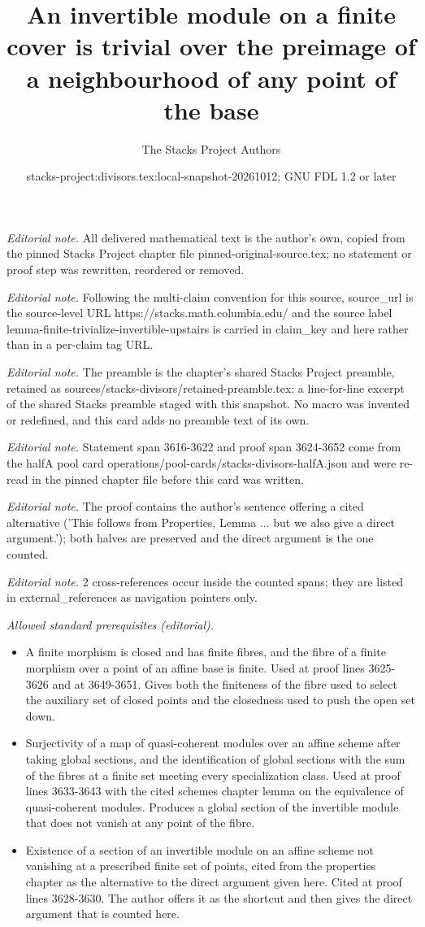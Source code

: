 \documentclass[10pt,a4paper]{amsart}
\title{An invertible module on a finite cover is trivial over the preimage of a neighbourhood of any point of the base}
\author{The Stacks Project Authors}
\date{stacks-project:divisors.tex:local-snapshot-20261012; GNU FDL 1.2 or later}
\theoremstyle{plain}
\theoremstyle{definition}
\theoremstyle{remark}
\numberwithin{equation}{subsection}
\begin{document}
\maketitle
\noindent\textit{Editorial note.} All delivered mathematical text is the author's own, copied from the pinned Stacks Project chapter file pinned-original-source.tex; no statement or proof step was rewritten, reordered or removed.\par\medskip
\noindent\textit{Editorial note.} Following the multi-claim convention for this source, source\_url is the source-level URL https://stacks.math.columbia.edu/ and the source label lemma-finite-trivialize-invertible-upstairs is carried in claim\_key and here rather than in a per-claim tag URL.\par\medskip
\noindent\textit{Editorial note.} The preamble is the chapter's shared Stacks Project preamble, retained as sources/stacks-divisors/retained-preamble.tex: a line-for-line excerpt of the shared Stacks preamble staged with this snapshot. No macro was invented or redefined, and this card adds no preamble text of its own.\par\medskip
\noindent\textit{Editorial note.} Statement span 3616-3622 and proof span 3624-3652 come from the halfA pool card operations/pool-cards/stacks-divisors-halfA.json and were re-read in the pinned chapter file before this card was written.\par\medskip
\noindent\textit{Editorial note.} The proof contains the author's sentence offering a cited alternative ('This follows from Properties, Lemma ... but we also give a direct argument.'); both halves are preserved and the direct argument is the one counted.\par\medskip
\noindent\textit{Editorial note.} 2 cross-references occur inside the counted spans; they are listed in external\_references as navigation pointers only.\par\medskip
\noindent\textit{Allowed standard prerequisites (editorial).}\begin{itemize}
\item A finite morphism is closed and has finite fibres, and the fibre of a finite morphism over a point of an affine base is finite. Used at proof lines 3625-3626 and at 3649-3651. Gives both the finiteness of the fibre used to select the auxiliary set of closed points and the closedness used to push the open set down.
\item Surjectivity of a map of quasi-coherent modules over an affine scheme after taking global sections, and the identification of global sections with the sum of the fibres at a finite set meeting every specialization class. Used at proof lines 3633-3643 with the cited schemes chapter lemma on the equivalence of quasi-coherent modules. Produces a global section of the invertible module that does not vanish at any point of the fibre.
\item Existence of a section of an invertible module on an affine scheme not vanishing at a prescribed finite set of points, cited from the properties chapter as the alternative to the direct argument given here. Cited at proof lines 3628-3630. The author offers it as the shortcut and then gives the direct argument that is counted here.
\end{itemize}\medskip
\end{document}
